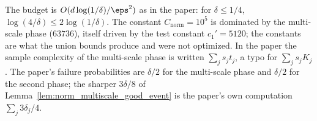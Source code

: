 \begin{remark}\label{rem:norm_constants}
The budget is $O(d\log(1/\delta)/\eps^2)$ as in the paper: for $\delta \le 1/4$,
$\log(4/\delta) \le 2\log(1/\delta)$. The constant $C_{\mathrm{norm}} = 10^5$ is dominated by the
multi-scale phase ($63736$), itself driven by the test constant $c_1' = 5120$; the
constants are what the union bounds produce and were not optimized. In the paper the
sample complexity of the multi-scale phase is written $\sum_j s_jt_j$, a typo for
$\sum_j s_jK_j$. The paper's failure probabilities are $\delta/2$ for the multi-scale phase
and $\delta/2$ for the second phase; the sharper $3\delta/8$ of
Lemma~\ref{lem:norm_multiscale_good_event} is the paper's own computation
$\sum_j 3\delta_j/4$.
\end{remark}
